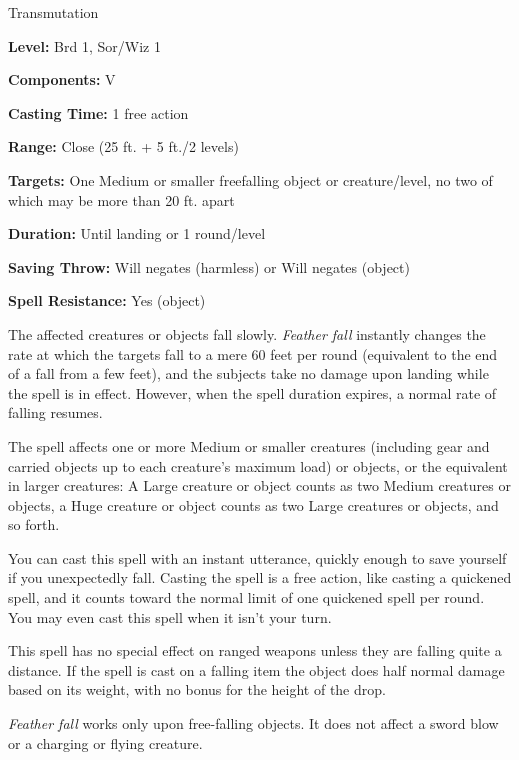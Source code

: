 
Transmutation

\textbf{Level:} Brd 1, Sor/Wiz 1

\textbf{Components:} V

\textbf{Casting Time:} 1 free action

\textbf{Range:} Close (25 ft. + 5 ft./2 levels)

\textbf{Targets:} One Medium or smaller freefalling object or creature/level, no 
two of which may be more than 20 ft. apart

\textbf{Duration:} Until landing or 1 round/level

\textbf{Saving Throw:} Will negates (harmless) or Will negates (object)

\textbf{Spell Resistance:} Yes (object)

The affected creatures or objects fall slowly. \textit{Feather fall} instantly 
changes the rate at which the targets fall to a mere 60 feet per round (equivalent 
to the end of a fall from a few feet), and the subjects take no damage upon landing 
while the spell is in effect. However, when the spell duration expires, a normal 
rate of falling resumes.

The spell affects one or more Medium or smaller creatures (including gear and carried 
objects up to each creature's maximum load) or objects, or the equivalent in larger 
creatures: A Large creature or object counts as two Medium creatures or objects, 
a Huge creature or object counts as two Large creatures or objects, and so forth.

You can cast this spell with an instant utterance, quickly enough to save yourself 
if you unexpectedly fall. Casting the spell is a free action, like casting a quickened 
spell, and it counts toward the normal limit of one quickened spell per round. 
You may even cast this spell when it isn't your turn.

This spell has no special effect on ranged weapons unless they are falling quite 
a distance. If the spell is cast on a falling item the object does half normal 
damage based on its weight, with no bonus for the height of the drop.

\textit{Feather fall} works only upon free-falling objects. It does not affect 
a sword blow or a charging or flying creature.

